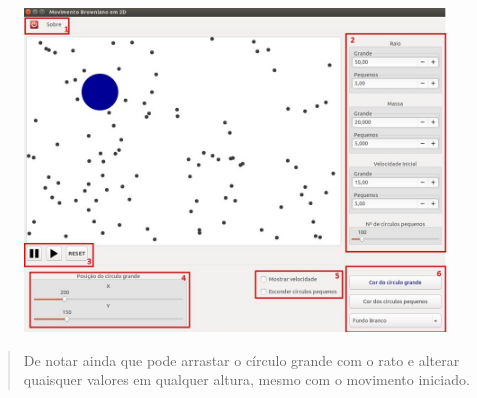 \documentclass[11pt]{article}
\begin{document}
\begin{figure}[hb]
\centering
\includegraphics[scale=0.4]{tela}
\end{figure}

\begin{quote}
 \qquad De notar ainda que pode arrastar o c\'{i}rculo grande com o rato e alterar quaisquer valores em qualquer altura, mesmo com o movimento iniciado.
\end{quote}
\end{document}
